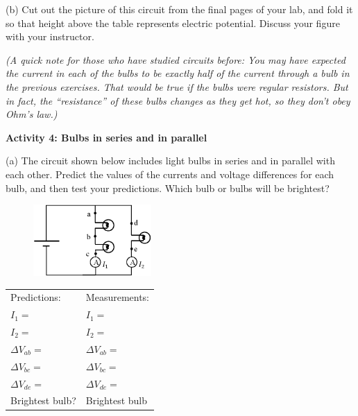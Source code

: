 (b)  Cut out the picture of this circuit from the final pages of your lab, and fold it so that height above the table represents electric potential.  Discuss your figure with your instructor. 

\textit{(A quick note for those who have studied circuits before:  You may have expected the current in each of the bulbs to be exactly half of the current through a bulb in the previous exercises.  That would be true if the bulbs were regular resistors.  But in fact, the ``resistance'' of these bulbs changes as they get hot, so they don't obey Ohm's law.)}

\textbf{Activity 4: Bulbs in series and in parallel} \par
\nopagebreak
(a) The circuit shown below includes light bulbs in series and in parallel with each other.  Predict the values of the currents and voltage differences for each bulb, and then test your predictions.  Which bulb or bulbs will be brightest? \par

\begin{figure}
    \vspace{-1.0 in}
    \includegraphics[width=0.4\textwidth]{electric_circuits/circ_diag5.eps}
\end{figure}

\vspace{0.1 in}
\renewcommand{\arraystretch}{1.6}
\hspace*{0.5in}
\begin{tabular}{l l}
Predictions: \hspace{0.7in} & Measurements: \\
$I_1 =$ & $I_1 =$ \\
$I_2 =$ & $I_2 =$ \\
$\Delta V_{ab} =$ & $\Delta V_{ab} =$ \\
$\Delta V_{bc} =$ & $\Delta V_{bc} =$ \\
$\Delta V_{de} =$ & $\Delta V_{de} =$ \\
Brightest bulb? & Brightest bulb \\
\end{tabular}
\renewcommand{\arraystretch}{1.0}
\vspace{0.3in}

